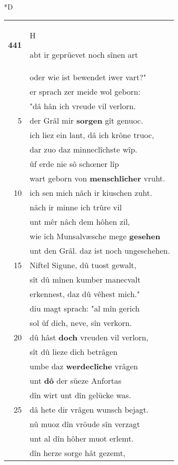 \documentclass[8pt,a4paper,notitlepage]{article}
\begin{document}
\begin{table}[ht]
\begin{minipage}[t]{0.5\linewidth}
\small
\begin{center}*D
\end{center}
\begin{tabular}{rl}
\textbf{441} & \begin{large}H\end{large}abt ir geprüevet noch sînen art\\ 
 & oder wie ist bewendet iwer vart?"\\ 
 & er sprach zer meide wol geborn:\\ 
 & "dâ hân ich vreude vil verlorn.\\ 
5 & der Grâl mir \textbf{sorgen} gît genuoc.\\ 
 & ich liez ein lant, dâ ich krône truoc,\\ 
 & dar zuo daz minneclîchste wîp.\\ 
 & ûf erde nie sô schœner lîp\\ 
 & wart geborn von \textbf{menschlîcher} vruht.\\ 
10 & ich sen mich nâch ir kiuschen zuht.\\ 
 & nâch ir minne ich trûre vil\\ 
 & unt mêr nâch dem hôhen zil,\\ 
 & wie ich Munsalvæsche mege \textbf{gesehen}\\ 
 & unt den Grâl. daz ist noch ungeschehen.\\ 
15 & Niftel Sigune, dû tuost gewalt,\\ 
 & sît dû mînen kumber manecvalt\\ 
 & erkennest, daz dû vêhest mich."\\ 
 & diu magt sprach: "al mîn gerich\\ 
 & sol ûf dich, neve, sîn verkorn.\\ 
20 & dû hâst \textbf{doch} vreuden vil verlorn,\\ 
 & sît dû lieze dich betrâgen\\ 
 & umbe daz \textbf{werdeclîche} vrâgen\\ 
 & unt \textbf{dô} der süeze Anfortas\\ 
 & dîn wirt unt dîn gelücke was.\\ 
25 & dâ hete dir vrâgen wunsch bejagt.\\ 
 & nû muoz dîn vröude sîn verzagt\\ 
 & unt al dîn hôher muot erlemt.\\ 
 & dîn herze sorge hât gezemt,\\ 

\end{tabular}
\end{minipage}
\end{table}
\end{document}
